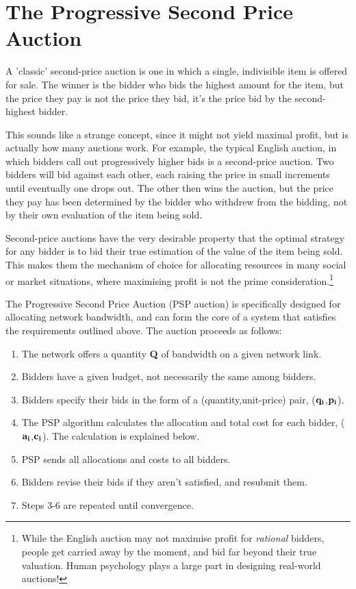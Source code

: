 \section{The Progressive Second Price Auction}

A 'classic' second-price auction is one in which a single, indivisible item is offered for sale. The winner is the bidder who bids the highest amount for the item, but the price they pay is not the price they bid, it's the price bid by the second-highest bidder.

This sounds like a strange concept, since it might not yield maximal profit, but is actually how many auctions work. For example, the typical English auction, in which bidders call out progressively higher bids is a second-price auction. Two bidders will bid against each other, each raising the price in small increments until eventually one drops out. The other then wins the auction, but the price they pay has been determined by the bidder who withdrew from the bidding, not by their own evaluation of the item being sold.

Second-price auctions have the very desirable property that the optimal strategy for any bidder is to bid their true estimation of the value of the item being sold. This makes them the mechanism of choice for allocating resources in many social or market situations, where maximising profit is not the prime consideration.\footnote{While the English auction may not maximise profit for {\it rational} bidders, people get carried away by the moment, and bid far beyond their true valuation. Human psychology plays a large part in designing real-world auctions!}

The Progressive Second Price Auction (PSP auction)\cite{PSP} is specifically designed for allocating network bandwidth, and can form the core of a system that satisfies the requirements outlined above. The auction proceeds as follows:

\begin{enumerate}
\item[1)] The network offers a quantity {\bf Q} of bandwidth on a given network link.
\item[2)] Bidders have a given budget, not necessarily the same among bidders.
\item[3)] Bidders specify their bids in the form of a (quantity,unit-price) pair, (${\bf q_i}$,${\bf p_i}$).
\item[4)] The PSP algorithm calculates the allocation and total cost for each bidder, (${\bf a_i}$,${\bf c_i}$). The calculation is explained below.
\item[5)] PSP sends all allocations and costs to all bidders.
\item[6)] Bidders revise their bids if they aren't satisfied, and resubmit them.
\item[7)] Steps 3-6 are repeated until convergence.
\end{enumerate}

